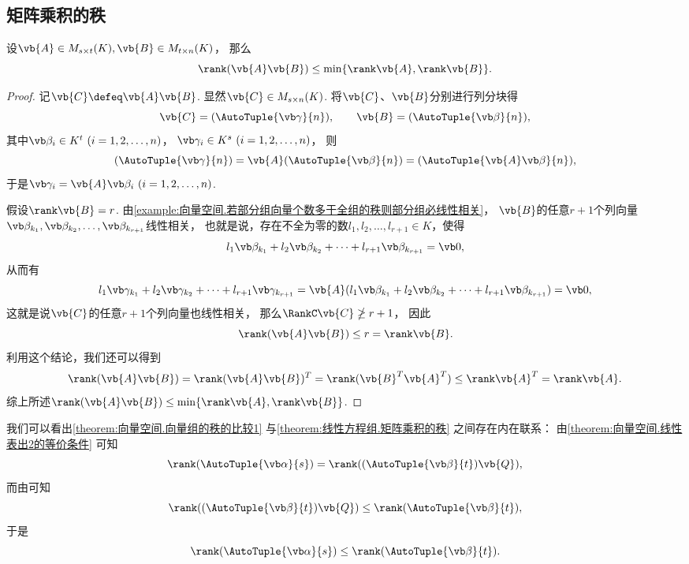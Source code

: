 \subsection{矩阵乘积的秩}
\begin{theorem}\label{theorem:线性方程组.矩阵乘积的秩}
设\(\vb{A} \in M_{s \times t}(K),
\vb{B} \in M_{t \times n}(K)\)，
那么\[
	\rank(\vb{A}\vb{B}) \leq \min\{\rank\vb{A},\rank\vb{B}\}.
\]
\begin{proof}
记\(\vb{C} \defeq \vb{A}\vb{B}\).
显然\(\vb{C} \in M_{s \times n}(K)\).
将\(\vb{C}\)、\(\vb{B}\)分别进行列分块得\[
	\vb{C} = (\AutoTuple{\vb\gamma}{n}),
	\qquad
	\vb{B} = (\AutoTuple{\vb\beta}{n}),
\]
其中\(\vb\beta_i \in K^t\ (i=1,2,\dotsc,n)\)，
\(\vb\gamma_i \in K^s\ (i=1,2,\dotsc,n)\)，
则\[
	(\AutoTuple{\vb\gamma}{n})
	= \vb{A} (\AutoTuple{\vb\beta}{n})
	= (\AutoTuple{\vb{A}\vb\beta}{n}),
\]
于是\(\vb\gamma_i = \vb{A} \vb\beta_i\ (i=1,2,\dotsc,n)\).

假设\(\rank\vb{B} = r\).
由\cref{example:向量空间.若部分组向量个数多于全组的秩则部分组必线性相关}，
\(\vb{B}\)的任意\(r+1\)个列向量
\(\vb\beta_{k_1},\vb\beta_{k_2},\dotsc,\vb\beta_{k_{r+1}}\)线性相关，
也就是说，存在不全为零的数\(l_1,l_2,\dotsc,l_{r+1}\in K\)，使得\[
	l_1 \vb\beta_{k_1} + l_2 \vb\beta_{k_2} + \dotsb + l_{r+1} \vb\beta_{k_{r+1}} = \vb0,
\]
从而有\[
	l_1 \vb\gamma_{k_1} + l_2 \vb\gamma_{k_2} + \dotsb + l_{r+1} \vb\gamma_{k_{r+1}}
	= \vb{A}(l_1 \vb\beta_{k_1} + l_2 \vb\beta_{k_2} + \dotsb + l_{r+1} \vb\beta_{k_{r+1}})
	= \vb0,
\]
这就是说\(\vb{C}\)的任意\(r+1\)个列向量也线性相关，
那么\(\RankC\vb{C} \ngeq r+1\)，
因此\[
	\rank(\vb{A}\vb{B})
	\leq r = \rank\vb{B}.
\]
利用这个结论，我们还可以得到\[
	\rank(\vb{A}\vb{B})
	= \rank(\vb{A}\vb{B})^T
	= \rank(\vb{B}^T \vb{A}^T)
	\leq \rank \vb{A}^T
	= \rank \vb{A}.
\]
综上所述\(\rank(\vb{A}\vb{B}) \leq \min\{\rank\vb{A},\rank\vb{B}\}\).
\end{proof}
\end{theorem}
\begin{remark}
我们可以看出\cref{theorem:向量空间.向量组的秩的比较1}
与\cref{theorem:线性方程组.矩阵乘积的秩} 之间存在内在联系：
由\cref{theorem:向量空间.线性表出2的等价条件} 可知\[
	\rank(\AutoTuple{\vb\alpha}{s})
	= \rank((\AutoTuple{\vb\beta}{t})\vb{Q}),
\]
而由可知\[
	\rank((\AutoTuple{\vb\beta}{t})\vb{Q})
	\leq \rank(\AutoTuple{\vb\beta}{t}),
\]
于是\[
	\rank(\AutoTuple{\vb\alpha}{s})
	\leq \rank(\AutoTuple{\vb\beta}{t}).
\]
\end{remark}


